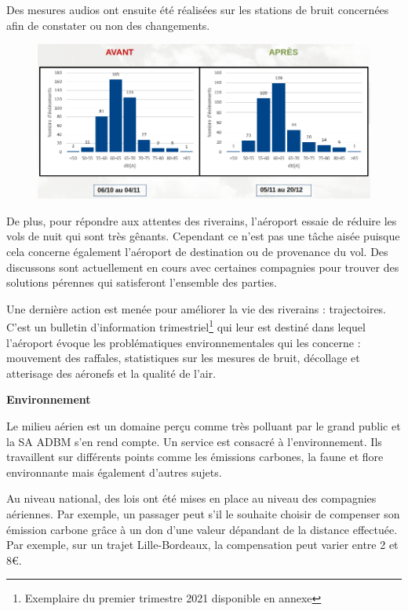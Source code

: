 Des mesures audios ont ensuite été réalisées sur les stations de bruit concernées afin de constater ou non des changements.

\begin{figure}[hbt!]
  \centering
  \includegraphics[width=14cm]{Images/bruit_avant_apres.png}\newline
  \label{fig:Mesures audios}
\end{figure}

De plus, pour répondre aux attentes des riverains, l'aéroport essaie de réduire les vols de nuit qui sont très gênants. Cependant ce n'est pas une tâche aisée puisque cela concerne également l'aéroport de destination ou de provenance du vol. Des discussons sont actuellement en cours avec certaines compagnies pour trouver des solutions pérennes qui satisferont l'ensemble des parties.\newline


Une dernière action est menée pour améliorer la vie des riverains : trajectoires. C'est un bulletin d'information trimestriel\footnote{Exemplaire du premier trimestre 2021 disponible en annexe} qui leur est destiné dans lequel l'aéroport évoque les problématiques environnementales qui les concerne : mouvement des raffales, statistiques sur les mesures de bruit, décollage et atterisage des aéronefs et la qualité de l'air.


\textbf{Environnement}\newline

Le milieu aérien est un domaine perçu comme très polluant par le grand public et la SA ADBM s'en rend compte. Un service est consacré à l'environnement. Ils travaillent sur différents points comme les émissions carbones, la faune et flore environnante mais également d'autres sujets.


Au niveau national, des lois ont été mises en place au niveau des compagnies aériennes. Par exemple, un passager peut s'il le souhaite choisir de compenser son émission carbone grâce à un don d'une valeur dépandant de la distance effectuée. Par exemple, sur un trajet Lille-Bordeaux, la compensation peut varier entre 2 et 8€.

